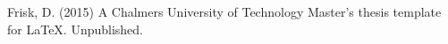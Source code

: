 \begin{thebibliography}{69}

 Frisk, D. (2015) A Chalmers University of Technology Master's thesis template for \LaTeX . Unpublished.



\end{thebibliography}
